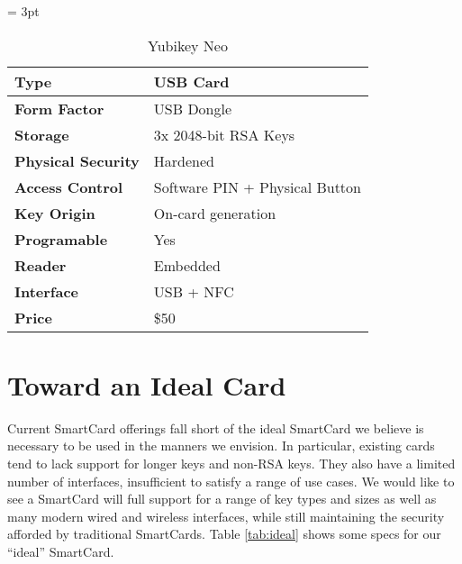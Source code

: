 \documentclass[11pt, twocolumn]{article}
\begin{document}
\begin{table*}[!htb]
  \vspace{3ex}
  \begin{center}
    \tabulinesep = 3pt
    \begin{tabu} to \textwidth
      { | X[1,c,m]
        | X[2,c,m]
        | }
      \hline
      \textbf{Type}
      & USB Card
      \\ \hline
      \textbf{Form Factor}
      & USB Dongle
      \\ \hline
      \textbf{Storage}
      & 3x 2048-bit RSA Keys
      \\ \hline
      \textbf{Physical Security}
      & Hardened
      \\ \hline
      \textbf{Access Control}
      & Software PIN + Physical Button
      \\ \hline
      \textbf{Key Origin}
      & On-card generation
      \\ \hline
      \textbf{Programable}
      & Yes
      \\ \hline
      \textbf{Reader}
      & Embedded
      \\ \hline
      \textbf{Interface}
      & USB + NFC
      \\ \hline
      \textbf{Price}
      & \$50
      \\ \hline
      \end{tabu}
  \end{center}
  \caption{Yubikey Neo}
  \label{tab:yubikeyneo}
\end{table*}

\section{Toward an Ideal Card}
\label{sec:ideal}

Current SmartCard offerings fall short of the ideal SmartCard we
believe is necessary to be used in the manners we envision. In
particular, existing cards tend to lack support for longer keys and
non-RSA keys. They also have a limited number of interfaces,
insufficient to satisfy a range of use cases. We would like to see a
SmartCard will full support for a range of key types and sizes as well
as many modern wired and wireless interfaces, while still maintaining
the security afforded by traditional SmartCards. Table \ref{tab:ideal}
shows some specs for our ``ideal'' SmartCard.
\end{document}
